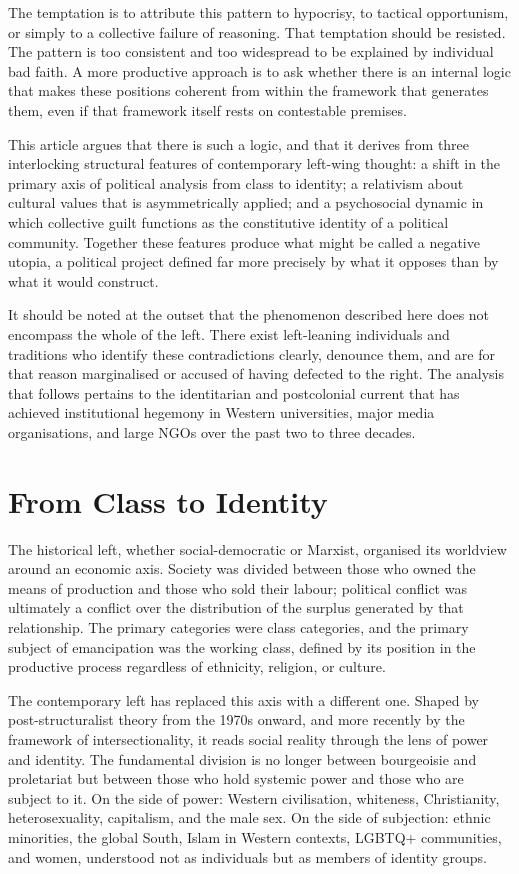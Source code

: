 \documentclass[12pt,a4paper]{article}
\begin{document}
	The temptation is to attribute this pattern to hypocrisy, to tactical opportunism,
	or simply to a collective failure of reasoning. That temptation should be resisted.
	The pattern is too consistent and too widespread to be explained by individual
	bad faith. A more productive approach is to ask whether there is an internal logic
	that makes these positions coherent from within the framework that generates them,
	even if that framework itself rests on contestable premises.
	
	This article argues that there is such a logic, and that it derives from three
	interlocking structural features of contemporary left-wing thought: a shift in the
	primary axis of political analysis from class to identity; a relativism about
	cultural values that is asymmetrically applied; and a psychosocial dynamic in which
	collective guilt functions as the constitutive identity of a political community.
	Together these features produce what might be called a negative utopia, a political
	project defined far more precisely by what it opposes than by what it would
	construct.
	
	It should be noted at the outset that the phenomenon described here does not
	encompass the whole of the left. There exist left-leaning individuals and traditions
	who identify these contradictions clearly, denounce them, and are for that reason
	marginalised or accused of having defected to the right. The analysis that follows
	pertains to the identitarian and postcolonial current that has achieved institutional
	hegemony in Western universities, major media organisations, and large NGOs over the
	past two to three decades.
	
	\section{From Class to Identity}
	
	The historical left, whether social-democratic or Marxist, organised its worldview
	around an economic axis. Society was divided between those who owned the means of
	production and those who sold their labour; political conflict was ultimately a
	conflict over the distribution of the surplus generated by that relationship. The
	primary categories were class categories, and the primary subject of emancipation
	was the working class, defined by its position in the productive process regardless
	of ethnicity, religion, or culture.
	
	The contemporary left has replaced this axis with a different one. Shaped by
	post-structuralist theory from the 1970s onward, and more recently by the framework
	of intersectionality, it reads social reality through the lens of power and
	identity. The fundamental division is no longer between bourgeoisie and proletariat
	but between those who hold systemic power and those who are subject to it. On the
	side of power: Western civilisation, whiteness, Christianity, heterosexuality,
	capitalism, and the male sex. On the side of subjection: ethnic minorities, the
	global South, Islam in Western contexts, LGBTQ+ communities, and women, understood
	not as individuals but as members of identity groups.
	
\end{document}
